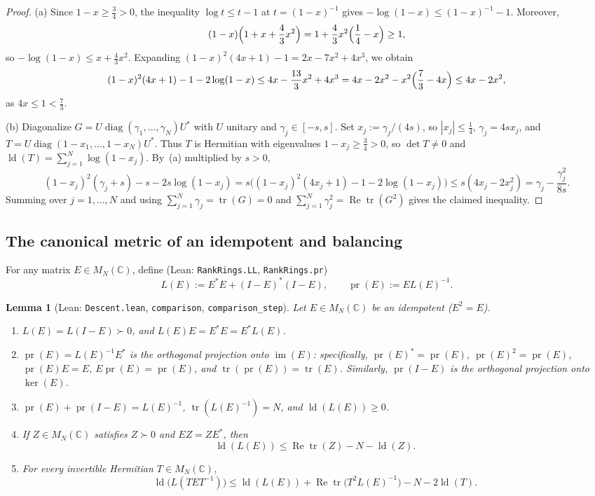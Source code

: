 \documentclass[11pt]{article}
\newtheorem{lemma}[theorem]{Lemma}
\theoremstyle{definition}
\theoremstyle{remark}
\numberwithin{equation}{section}
\DeclareMathOperator{\tr}{tr}
\DeclareMathOperator{\ld}{ld}
\DeclareMathOperator{\pr}{pr}
\DeclareMathOperator{\diag}{diag}
\DeclareMathOperator{\im}{im}
\DeclareMathOperator{\RePart}{Re}
\newcommand{\C}{\mathbb{C}}
\newcommand{\1}{\mathbf{1}}
\newcommand{\code}[1]{{\normalfont\small\texttt{#1}}}
\begin{document}
\begin{proof}
(a) Since $1 - x \ge \frac{3}{4} > 0$, the inequality $\log t \le t - 1$ at $t = (1 - x)^{-1}$ gives $-\log(1 - x) \le (1 - x)^{-1} - 1$. Moreover,
\[
(1 - x)\Bigl(1 + x + \frac{4}{3}x^2\Bigr) = 1 + \frac{4}{3}x^2\Bigl(\frac{1}{4} - x\Bigr) \ge 1,
\]
so $-\log(1 - x) \le x + \frac{4}{3}x^2$. Expanding $(1 - x)^2(4x + 1) - 1 = 2x - 7x^2 + 4x^3$, we obtain
\[
(1 - x)^2(4x + 1) - 1 - 2\log(1 - x)
\le 4x - \frac{13}{3}x^2 + 4x^3
= 4x - 2x^2 - x^2\Bigl(\frac{7}{3} - 4x\Bigr)
\le 4x - 2x^2,
\]
as $4x \le 1 < \frac{7}{3}$.

(b) Diagonalize $G = U \diag(\gamma_1, \dots, \gamma_N) U^*$ with $U$ unitary and $\gamma_j \in [-s, s]$. Set $x_j := \gamma_j / (4s)$, so $|x_j| \le \frac{1}{4}$, $\gamma_j = 4s x_j$, and $T = U \diag(1 - x_1, \dots, 1 - x_N) U^*$. Thus $T$ is Hermitian with eigenvalues $1 - x_j \ge \frac{3}{4} > 0$, so $\det T \neq 0$ and $\ld(T) = \sum_{j=1}^N \log(1 - x_j)$. By~(a) multiplied by $s > 0$,
\[
(1 - x_j)^2(\gamma_j + s) - s - 2s\log(1 - x_j)
= s\bigl((1 - x_j)^2(4x_j + 1) - 1 - 2\log(1 - x_j)\bigr)
\le s(4x_j - 2x_j^2) = \gamma_j - \frac{\gamma_j^2}{8s}.
\]
Summing over $j = 1, \dots, N$ and using $\sum_{j=1}^N \gamma_j = \tr(G) = 0$ and $\sum_{j=1}^N \gamma_j^2 = \RePart\tr(G^2)$ gives the claimed inequality.
\end{proof}

\subsection{The canonical metric of an idempotent and balancing}

For any matrix $E \in M_N(\C)$, define (Lean: \code{RankRings.LL}, \code{RankRings.pr})
\[
L(E) := E^* E + (I - E)^*(I - E), \qquad \pr(E) := E L(E)^{-1}.
\]

\begin{lemma}[Lean: \code{Descent.lean}, \code{comparison}, \code{comparison\_step}]
\label{lem:L-idem}
Let $E \in M_N(\C)$ be an idempotent ($E^2 = E$).
\begin{enumerate}[label=\textup{(\alph*)},leftmargin=2.2em]
\item $L(E) = L(I - E) \succ 0$, and $L(E)E = E^*E = E^* L(E)$.
\item $\pr(E) = L(E)^{-1} E^*$ is the orthogonal projection onto $\im(E)$: specifically, $\pr(E)^* = \pr(E)$, $\pr(E)^2 = \pr(E)$, $\pr(E)E = E$, $E\pr(E) = \pr(E)$, and $\tr(\pr(E)) = \tr(E)$. Similarly, $\pr(I - E)$ is the orthogonal projection onto $\ker(E)$.
\item $\pr(E) + \pr(I - E) = L(E)^{-1}$, $\tr(L(E)^{-1}) = N$, and $\ld(L(E)) \ge 0$.
\item If $Z \in M_N(\C)$ satisfies $Z \succ 0$ and $EZ = ZE^*$, then
\[
\ld(L(E)) \le \RePart\tr(Z) - N - \ld(Z).
\]
\item For every invertible Hermitian $T \in M_N(\C)$,
\[
\ld\bigl(L(T E T^{-1})\bigr) \le \ld(L(E)) + \RePart\tr\bigl(T^2 L(E)^{-1}\bigr) - N - 2\ld(T).
\]
\end{enumerate}
\end{lemma}
\end{document}
